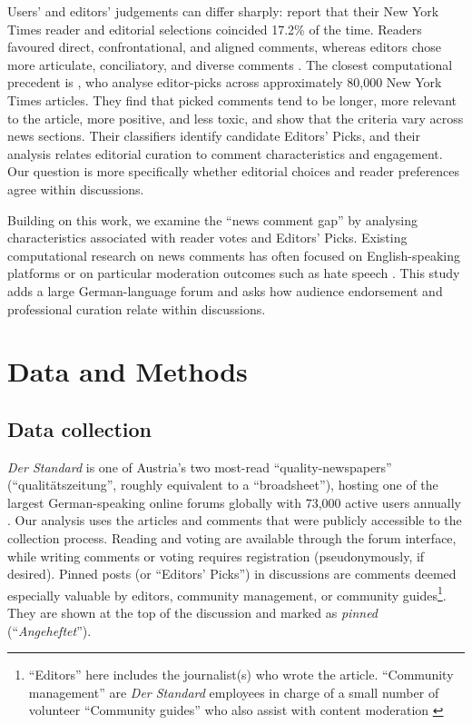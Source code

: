 Users' and editors' judgements can differ sharply: \citet{JuarezMiro2022} report that their New York Times reader and editorial selections coincided 17.2\% of the time. Readers favoured direct, confrontational, and aligned comments, whereas editors chose more articulate, conciliatory, and diverse comments \citep{JuarezMiro2022}. The closest computational precedent is \citet{He2024}, who analyse editor-picks across approximately 80,000 New York Times articles. They find that picked comments tend to be longer, more relevant to the article, more positive, and less toxic, and show that the criteria vary across news sections. Their classifiers identify candidate Editors' Picks, and their analysis relates editorial curation to comment characteristics and engagement. Our question is more specifically whether editorial choices and reader preferences agree within discussions.

Building on this work, we examine the ``news comment gap'' by analysing characteristics associated with reader votes and Editors' Picks. Existing computational research on news comments has often focused on English-speaking platforms or on particular moderation outcomes such as hate speech \citep{Reimer2021}. This study adds a large German-language forum and asks how audience endorsement and professional curation relate within discussions.

\section{Data and Methods}
\label{sec:data}
\subsection{Data collection}

\textit{Der Standard} is one of Austria's two most-read ``quality-newspapers'' (``qualitätszeitung'', roughly equivalent to a ``broadsheet''), hosting one of the largest German-speaking online forums globally with 73,000 active users annually \citep{Burger2022}. Our analysis uses the articles and comments that were publicly accessible to the collection process. Reading and voting are available through the forum interface, while writing comments or voting requires registration (pseudonymously, if desired). Pinned posts (or ``Editors' Picks'') in discussions are comments deemed especially valuable by editors, community management, or community guides\footnote{``Editors'' here includes the journalist(s) who wrote the article. ``Community management'' are \textit{Der Standard} employees in charge of a small number of volunteer ``Community guides'' who also assist with content moderation \citep{DerStandard2021}}. They are shown at the top of the discussion and marked as \emph{pinned} (``\emph{Angeheftet}'').

